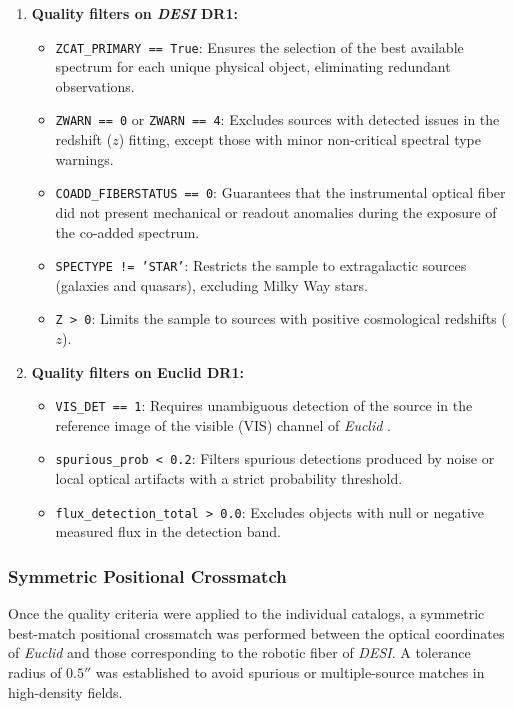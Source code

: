 \begin{enumerate}
\item \textbf{Quality filters on \textit{\gls{DESI}} DR1:}
    \begin{itemize}
    \item \texttt{ZCAT\_PRIMARY == True}: Ensures the selection of the best available spectrum for each unique physical object, eliminating redundant observations.
    \item \texttt{ZWARN == 0} or \texttt{ZWARN == 4}: Excludes sources with detected issues in the redshift ($z$) fitting, except those with minor non-critical spectral type warnings.
    \item \texttt{COADD\_FIBERSTATUS == 0}: Guarantees that the instrumental optical fiber did not present mechanical or readout anomalies during the exposure of the co-added spectrum.
    \item \texttt{SPECTYPE != 'STAR'}: Restricts the sample to extragalactic sources (galaxies and quasars), excluding Milky Way stars.
    \item \texttt{Z > 0}: Limits the sample to sources with positive cosmological redshifts ($z$).
    \end{itemize}

\item \textbf{Quality filters on Euclid DR1:}
    \begin{itemize}
    \item \texttt{VIS\_DET == 1}: Requires unambiguous detection of the source in the reference image of the visible (VIS) channel of \textit{Euclid} \autocite{ar:cropper-2024}.
    \item \texttt{spurious\_prob < 0.2}: Filters spurious detections produced by noise or local optical artifacts with a strict probability threshold.
    \item \texttt{flux\_detection\_total > 0.0}: Excludes objects with null or negative measured flux in the detection band.
    \end{itemize}
\end{enumerate}

\subsubsection{Symmetric Positional Crossmatch}

Once the quality criteria were applied to the individual catalogs, a symmetric best-match positional crossmatch was performed between the optical coordinates of \textit{Euclid} and those corresponding to the robotic fiber of \textit{\gls{DESI}}. A tolerance radius of $0.5''$ was established to avoid spurious or multiple-source matches in high-density fields.

